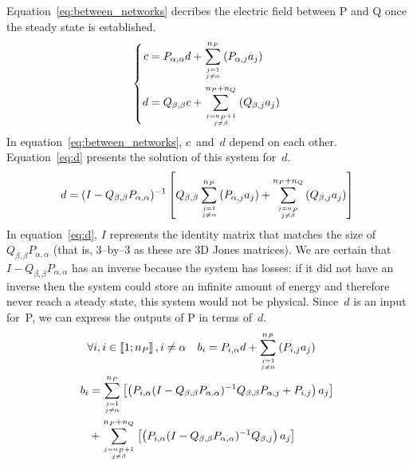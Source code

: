 \documentclass[a4paper,11pt]{article}
\begin{document}
Equation~\eqref{eq:between_networks} decribes the electric field between P and Q once the steady state is established.
\begin{equation}
    \left\lbrace
    \begin{aligned}
        c
        &=
        P_{\alpha, \alpha} d + \sum_{j = 1 \atop j \neq \alpha}^{n_P}
        \left(
            P_{\alpha, j}a_j
        \right)
        \\
        d
        &=
        Q_{\beta, \beta} c + \sum_{j = n_P+1 \atop j \neq \beta}^{n_P + n_Q}
        \left(
            Q_{\beta, j}a_j
        \right)
    \end{aligned}
    \right.
    \label{eq:between_networks}
\end{equation}
In equation~\eqref{eq:between_networks}, $c$~and~$d$ depend on each other.
Equation~\eqref{eq:d} presents the solution of this system for~$d$.
\begin{equation}
    d =
    (I - Q_{\beta, \beta} P_{\alpha, \alpha})^{-1}
    \left[
        Q_{\beta, \beta}
        \sum_{j = 1 \atop j \neq \alpha}^{n_P}
        \left(
            P_{\alpha, j}
            a_j
        \right)
        +
        \sum_{j = n_P \atop j \neq \beta}^{n_P + n_Q}
        \left(
            Q_{\beta, j}
            a_j
        \right)
    \right]
    \label{eq:d}
\end{equation}
In equation~\eqref{eq:d}, $I$ represents the identity matrix that matches the size of $Q_{\beta, \beta}P_{\alpha, \alpha}$ (that is, 3--by--3 as these are 3D Jones matrices).
We are certain that $I - Q_{\beta, \beta} P_{\alpha, \alpha}$ has an inverse because the system has losses: if it did not have an inverse then the system could store an infinite amount of energy and therefore never reach a steady state, this system would not be physical.
Since~$d$ is an input for~P, we can express the outputs of P in terms of~$d$.
\begin{gather}
\begin{aligned}
    \forall i, i
    &\in
    \left\llbracket 1 ; n_P \right\rrbracket, i \neq \alpha
    &
    b_i
    &=
    P_{i, \alpha} d
    + \sum_{j = 1 \atop j \neq \alpha}^{n_P}
    \left(
        P_{i, j}a_j
    \right)
\end{aligned}
\notag
\\
\begin{aligned}
    b_i
    &=
        \sum_{j = 1 \atop j \neq \alpha}^{n_P}
        \left[
            \left(
                P_{i, \alpha}
                (I - Q_{\beta, \beta} P_{\alpha, \alpha})^{-1}
                Q_{\beta, \beta}
                P_{\alpha, j}
                +
                P_{i, j}
            \right)
            a_j
        \right]
    \\
    &+
        \sum_{j = n_P+1 \atop j \neq \beta}^{n_P + n_Q}
        \left[
            \left(
                P_{i, \alpha}
                (I - Q_{\beta, \beta} P_{\alpha, \alpha})^{-1}
                Q_{\beta, j}
            \right)
            a_j
        \right]
\end{aligned}
\label{eq:P_side_of_S}
\end{gather}
\end{document}
